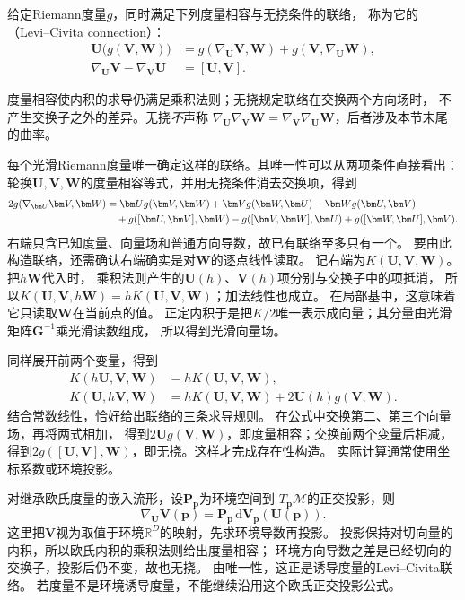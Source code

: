 \begin{definition}
\label{def:geometry-levi-civita-connection}
给定Riemann度量$g$，同时满足下列度量相容与无挠条件的联络，
称为它的（Levi--Civita connection）：
\begin{align*}
 \bm U\bigl(g(\bm V,\bm W)\bigr)
 &=g(\nabla_{\bm U}\bm V,\bm W)+g(\bm V,\nabla_{\bm U}\bm W),\\
 \nabla_{\bm U}\bm V-\nabla_{\bm V}\bm U&=[\bm U,\bm V].
\end{align*}
\end{definition}
度量相容使内积的求导仍满足乘积法则；无挠规定联络在交换两个方向场时，
不产生交换子之外的差异。无挠\emph{不}声称
$\nabla_{\bm U}\nabla_{\bm V}\bm W
=\nabla_{\bm V}\nabla_{\bm U}\bm W$，后者涉及本节末尾的曲率。

每个光滑Riemann度量唯一确定这样的联络。其唯一性可以从两项条件直接看出：
轮换$\bm U,\bm V,\bm W$的度量相容等式，并用无挠条件消去交换项，得到
\begin{align}
 2g(\nabla_{\bm U}\bm V,\bm W)
 &=\bm U g(\bm V,\bm W)+\bm V g(\bm W,\bm U)
   -\bm W g(\bm U,\bm V)\notag\\
 &\quad+g([\bm U,\bm V],\bm W)-g([\bm V,\bm W],\bm U)
   +g([\bm W,\bm U],\bm V).
 \label{eq:geometry-koszul-formula}
\end{align}
右端只含已知度量、向量场和普通方向导数，故已有联络至多只有一个。
要由此构造联络，还需确认右端确实是对$\bm W$的逐点线性读取。
记右端为$K(\bm U,\bm V,\bm W)$。把$h\bm W$代入时，
乘积法则产生的$\bm U(h)$、$\bm V(h)$项分别与交换子中的项抵消，
所以$K(\bm U,\bm V,h\bm W)=hK(\bm U,\bm V,\bm W)$；加法线性也成立。
在局部基中，这意味着它只读取$\bm W$在当前点的值。
正定内积于是把$K/2$唯一表示成向量；其分量由光滑矩阵$\bm G^{-1}$乘光滑读数组成，
所以得到光滑向量场。

同样展开前两个变量，得到
\[
\begin{aligned}
 K(h\bm U,\bm V,\bm W)&=hK(\bm U,\bm V,\bm W),\\
 K(\bm U,h\bm V,\bm W)&=hK(\bm U,\bm V,\bm W)
   +2\bm U(h)g(\bm V,\bm W).
\end{aligned}
\]
结合常数线性，恰好给出联络的三条求导规则。
在公式中交换第二、第三个向量场，再将两式相加，
得到$2\bm U g(\bm V,\bm W)$，即度量相容；交换前两个变量后相减，
得到$2g([\bm U,\bm V],\bm W)$，即无挠。这样才完成存在性构造。
实际计算通常使用坐标系数或环境投影。

对继承欧氏度量的嵌入流形，设$\bm P_{\bm p}$为环境空间到
$T_{\bm p}\mathcal M$的正交投影，则
\begin{equation}
 \nabla_{\bm U}\bm V(\bm p)
 =\bm P_{\bm p}\,\mathrm d\bm V_{\bm p}(\bm U(\bm p)).
 \label{eq:geometry-projected-connection}
\end{equation}
这里把$\bm V$视为取值于环境$\mathbb R^D$的映射，先求环境导数再投影。
投影保持对切向量的内积，所以欧氏内积的乘积法则给出度量相容；
环境方向导数之差是已经切向的交换子，投影后仍不变，故也无挠。
由唯一性，这正是诱导度量的Levi--Civita联络。
若度量不是环境诱导度量，不能继续沿用这个欧氏正交投影公式。


